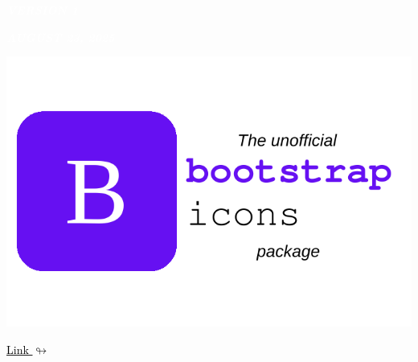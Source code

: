 \documentclass{article}
\begin{document}
\thispagestyle{empty}


\begin{flushright}
\begin{tcolorbox}[leftrule=3mm,arc=0mm,width=4.5cm]
\begin{center}
{\Large\textcolor{white}{\it\bf VERSION 1}}
\end{center}
\end{tcolorbox}
\end{flushright}

\begin{flushright}
\begin{tcolorbox}[leftrule=3mm,arc=0mm,width=6.5cm]
\begin{center}
{\Large\textcolor{white}{\it\bf AUGUST 23, 2025}}
\end{center}
\end{tcolorbox}
\end{flushright}

\hspace{0pt}
\vfill
\begin{center}
\includegraphics[scale=1.0]{bootstrapicons_logo.pdf}
\end{center}\vspace{2mm}
\begin{center}
    \href{https://github.com/BenSt099/bootstrapicons}{\textcolor{black}{Link $\looparrowright$}}
\end{center}
\vfill
\hspace{0pt}
\newpage

\thispagestyle{empty}

\doublespacing
\tableofcontents
\singlespacing
\end{document}
